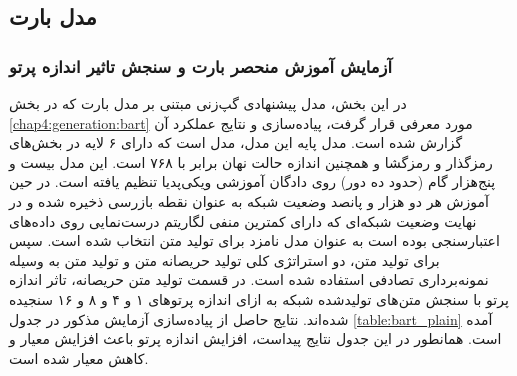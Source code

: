 \subsection{مدل بارت}

\subsubsection{آزمایش آموزش منحصر بارت و سنجش تاثیر اندازه پرتو} \label{chap5:bart:plain}
در این بخش،‌ مدل پیشنهادی گپ‌زنی مبتنی بر مدل بارت که در بخش 
\ref{chap4:generation:bart}
مورد معرفی قرار گرفت، پیاده‌سازی و نتایج عملکرد آن گزارش شده است. مدل پایه این مدل، مدل 
است که دارای ۶ لایه در بخش‌های رمزگذار و رمزگشا و همچنین اندازه حالت نهان برابر با ۷۶۸ است. این مدل بیست و پنج‌هزار گام (حدود ده دور) روی دادگان آموزشی ویکی‌پدیا تنظیم یافته است. 
در حین آموزش هر دو هزار و پانصد وضعیت شبکه به عنوان نقطه بازرسی ذخیره شده و در نهایت وضعیت شبکه‌ای که دارای کمترین منفی لگاریتم درست‌نمایی روی داده‌های اعتبارسنجی بوده است به عنوان مدل نامزد برای تولید متن انتخاب شده است. 
سپس برای تولید متن،‌ دو استراتژی کلی تولید حریصانه متن و تولید متن به وسیله نمونه‌برداری تصادفی استفاده شده است. در قسمت تولید متن حریصانه، تاثر اندازه پرتو با سنجش متن‌های تولید‌شده شبکه به ازای اندازه پرتو‌های ۱ و ۴ و ۸ و ۱۶ سنجیده شده‌اند. نتایج حاصل از پیاده‌سازی آزمایش مذکور در جدول 
\ref{table:bart_plain}
آمده است. همانطور در این جدول نتایج پیداست، افزایش اندازه پرتو باعث افزایش معیار
و کاهش معیار 
شده است.



